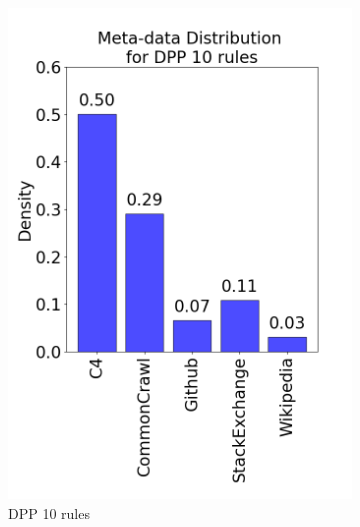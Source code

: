 \documentclass{article}
\begin{document}
\begin{figure}[H]
\centering

\begin{subfigure}{0.30\textwidth}
    \includegraphics[width=0.8\linewidth]{figures/Code_data_distribution_plots/data_distribution_ft_10rules_dpp.png}
    \caption{DPP 10 rules}
\end{subfigure}\hfill
\begin{subfigure}{0.30\textwidth}

\end{subfigure}
\end{figure}
\end{document}
